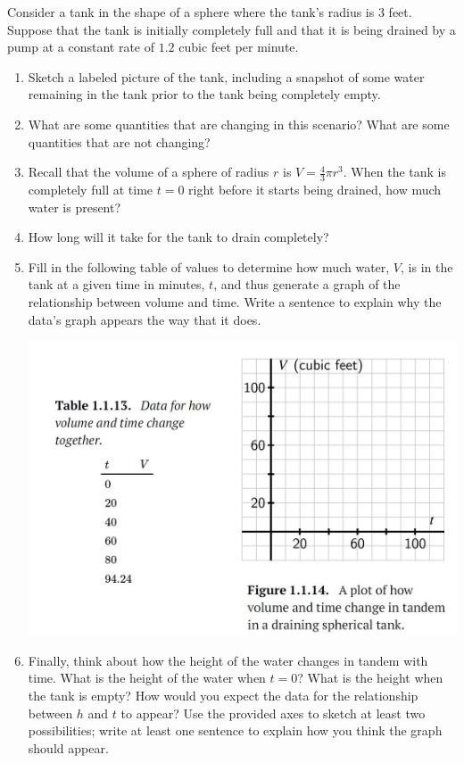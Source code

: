 \documentclass{ximera}
\begin{document}
\begin{tcolorbox}[colback=yellow!15, breakable,pad at break*=1mm]
\begin{example}

Consider a tank in the shape of a sphere where the tank's radius is \(3\) feet.  Suppose that the tank is initially completely full and that it is being drained by a pump at a constant rate of \(1.2\) cubic feet per minute.%

\begin{enumerate}[label=\alph*.]
\item Sketch a labeled picture of the tank, including a snapshot of some water remaining in the tank prior to the tank being completely empty.%
\item What are some quantities that are changing in this scenario?  What are some quantities that are not changing?%
\item Recall that the volume of a sphere of radius \(r\) is \(V = \frac{4}{3} \pi r^3\).  When the tank is completely full at time \(t = 0\) right before it starts being drained, how much water is present?%
\item How long will it take for the tank to drain completely?%
\item Fill in the following table of values to determine how much water, \(V\), is in the tank at a given time in minutes, \(t\), and thus generate a graph of the relationship between volume and time.  Write a sentence to explain why the data's graph appears the way that it does.%

\includegraphics[width=.9\textwidth]{APCfigure1.1.13.jpg}

\item Finally, think about how the height of the water changes in tandem with time. What is the height of the water when \(t = 0\)?  What is the height when the tank is empty?  How would you expect the data for the relationship between \(h\) and \(t\) to appear?  Use the provided axes to sketch at least two possibilities; write at least one sentence to explain how you think the graph should appear.%

\end{enumerate}
\end{example}
\end{tcolorbox}
\end{document}

